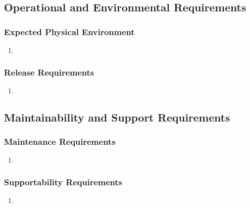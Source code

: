 \documentclass[english]{article}
\begin{document}
\subsection{Operational and Environmental Requirements}
\label{sub:operational_and_environmental_requirements}

\subsubsection{Expected Physical Environment}
\label{ssub:expected_physical_environment}
\begin{enumerate}[{EPE}1. ]
\item
\end{enumerate}

\subsubsection{Release Requirements}
\label{ssub:release_requirements}
\begin{enumerate}[{RR}1. ]
\item	
\end{enumerate}


\subsection{Maintainability and Support Requirements}
\label{sub:maintainability_and_support_requirements}

\subsubsection{Maintenance Requirements}
\label{ssub:maintenance_requirements}
\begin{enumerate}[{MR}1. ]
\item
\end{enumerate}

\subsubsection{Supportability Requirements}
\label{ssub:supportability_requirements}
\begin{enumerate}[{MSR}1. ]
\item
\end{enumerate}
\end{document}
